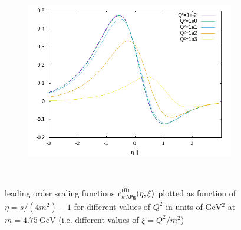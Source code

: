 \begin{figure}[ht!]
\begin{subfigure}[t]{.3\textwidth}
\end{subfigure}%
\begin{subfigure}[t]{.3\textwidth}
	\includegraphics[width=\textwidth]{../../img2/partonic/cg0_AA_x2g1}
\end{subfigure}\\%
\caption{leading order scaling functions $c_{k,\Pg}^{(0)}(\eta,\xi)$ plotted as function of $\eta=s/(4m^2)-1$ for different values of $Q^2$ in units of $\si{\GeV^2}$ at $m=\SI{4.75}{\GeV}$ (i.e. different values of $\xi=Q^2/m^2$) }\label{fig:cg0}
\end{figure}
